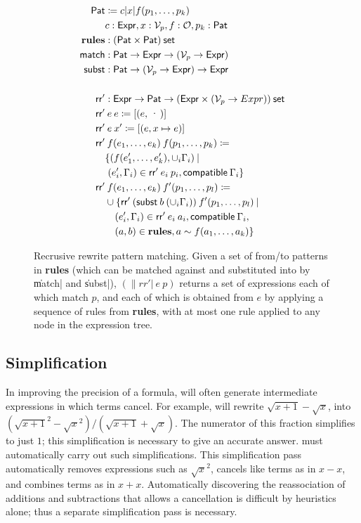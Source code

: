 \documentclass[paper.tex]{subfiles}
\begin{document}
\begin{figure}
\begin{align*}
  \Pat &\ceq c | x | f(p_1, \dotsc, p_k) \\
  & c : \Expr, x : \Var_p, f : \Op, p_k : \Pat \\
  \mathbf{rules} &: (\Pat \times \Pat)\:\|set| \\
  \|match| &: \Pat \to \Expr \to (\Var_p \to \Expr) \\
  \|subst| &: \Pat \to (\Var_p \to \Expr) \to \Expr \\
  \\
  \|rr'| &: \Expr \to \Pat \to (\Expr \times (\Var_p \to Expr))\:\|set| \\
  \|rr'| &\:e\:e \ceq [ (e, \cdot) ] \\
  \|rr'| &\:e\:x' \ceq [ (e, x \mapsto e) ] \\
  \|rr'| &\:f(e_1, \dotsc, e_k)\:f(p_1, \dotsc, p_k) \ceq \\
  & \{ ( f(e_1', \dotsc, e_k'), \cup_i \Gamma_i) \I \\
  & \; (e_i', \Gamma_i) \in \|rr'|\:e_i\:p_i, \|compatible|\:\Gamma_i \} \\
  \|rr'| &\:f(e_1, \dotsc, e_k)\:f'(p_1, \dotsc, p_l) \ceq \\
  & \cup \{ \|rr'|\:(\|subst|\:b\:(\cup_i \Gamma_i))\:f'(p_1, \dotsc, p_l) \I \\
  & \quad (e_i', \Gamma_i) \in \|rr'|\:e_i\:a_i, \|compatible|\:\Gamma_i, \\
  & \quad (a, b) \in \mathbf{rules}, a \sim f(a_1, \dotsc, a_k) \}
\end{align*}
\caption{Recrusive rewrite pattern matching.
  Given a set of from/to patterns in \textbf{rules}
  (which can be matched against and substituted into
  by \|match| and \|subst|),
  $(\|rr'|\:e\:p)$ returns a set of expressions
  each of which match $p$, and each of which is obtained from $e$
  by applying a sequence of rules from \textbf{rules},
  with at most one rule applied to any node in the expression tree.}
\label{alg:rm}
\end{figure}

\subsection{Simplification}

In improving the precision of a formula,
  \casio will often generate intermediate expressions in which terms cancel.
For example, \casio will rewrite $\sqrt{x+1} - \sqrt{x}$,
  into $(\sqrt{x+1}^2 - \sqrt{x}^2) / (\sqrt{x+1} + \sqrt{x})$.
The numerator of this fraction simplifies to just $1$;
  this simplification is necessary to give an accurate answer.
\casio must automatically carry out such simplifications.
This simplification pass automatically
  removes expressions such as $\sqrt{x}^2$,
  cancels like terms as in $x - x$,
  and combines terms as in $x + x$.
Automatically discovering
  the reassociation of additions and subtractions that allows a cancellation
  is difficult by heuristics alone;
  thus a separate simplification pass is necessary.
\end{document}
